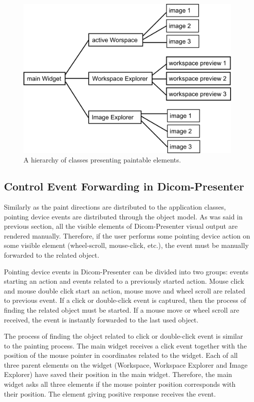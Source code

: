 \begin{figure}
	\caption{A hierarchy of classes presenting paintable elements.}
	\begin{center}
	\includegraphics[width=\textwidth]{Text/IMG/paint.png}
	\end{center}
	\label{paint}
\end{figure}

\subsection{Control Event Forwarding in Dicom-Presenter}

Similarly as the paint directions are distributed to the application classes, pointing device events are distributed through the object model. As was said in previous section, all the visible elements of Dicom-Presenter visual output are rendered manually. Therefore, if the user performs some pointing device action on some visible element (wheel-scroll, mouse-click, etc.), the event must be manually forwarded to the related object.

Pointing device events in Dicom-Presenter can be divided into two groups: events starting an action and events related to a previously started action. Mouse click and mouse double click start an action, mouse move and wheel scroll are related to previous event. If a click or double-click event is captured, then the process of finding the related object must be started. If a mouse move or wheel scroll are received, the event is instantly forwarded to the last used object.

The process of finding the object related to click or double-click event is similar to the painting process. The main widget receives a click event together with the position of the mouse pointer in coordinates related to the widget. Each of all three parent elements on the widget (Workspace, Workspace Explorer and Image Explorer) have saved their position in the main widget. Therefore, the main widget asks all three elements if the mouse pointer position corresponds with their position. The element giving positive response receives the event.

